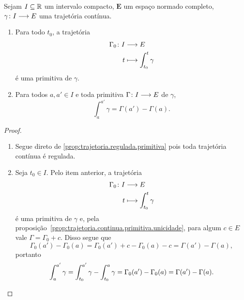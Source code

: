 \begin{proposition}
\label{prop:trajetoria.TFC}
Sejam $I \subseteq \mathbb{R}$ um intervalo compacto, $\bm E$ um espaço normado completo, $\gamma\colon \allowbreak I \longrightarrow E$ uma trajetória contínua.
	\begin{enumerate}
	\item Para todo $t_0$, a trajetória
		\begin{align*}
		{\Gamma_0}\colon {I} &\longrightarrow {E} \\{t} &\longmapsto \int_{t_0}^{t} \gamma
		\end{align*}
	é uma primitiva de $\gamma$.

	\item Para todos $a,a' \in I$ e toda primitiva $\Gamma\colon \allowbreak I \longrightarrow E$ de $\gamma$,
		\begin{equation*}
		\int_{a}^{a'} \gamma = \Gamma(a') - \Gamma(a).
		\end{equation*}
	\end{enumerate}
\end{proposition}
\begin{proof}
	\begin{enumerate}
	\item Segue direto de \ref{prop:trajetoria.regulada.primitiva} pois toda trajetória contínua é regulada.

	\item Seja $t_0 \in I$. Pelo item anterior, a trajetória
		\begin{align*}
		{\Gamma_0}\colon {I} &\longrightarrow {E} \\{t} &\longmapsto \int_{t_0}^{t} \gamma
		\end{align*}
	é uma primitiva de $\gamma$ e, pela proposição~\ref{prop:trajetoria.continua.primitiva.unicidade}, para algum $c \in E$ vale $\Gamma = \Gamma_0 + c$. Disso segue que
		\begin{equation*}
		\Gamma_0(a') - \Gamma_0(a) = \Gamma_0(a') + c - \Gamma_0(a) - c = \Gamma(a') - \Gamma(a),
		\end{equation*}
	portanto
		\begin{equation*}
		\int_{a}^{a'} \gamma = \int_{t_0}^{a'} \gamma - \int_{t_0}^{a} \gamma = \Gamma_0(a') - \Gamma_0(a) = \Gamma(a') - \Gamma(a).
		\qedhere
		\end{equation*}
	\end{enumerate}
\end{proof}










